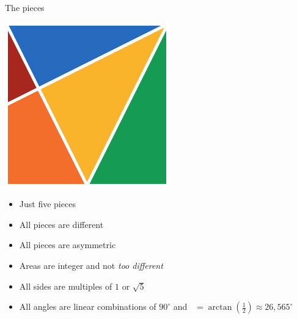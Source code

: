 \documentclass[14pt]{beamer}
\begin{document}

    \begin{frame}{The pieces}
        \begin{center}

            \begin{minipage}{17.5ex}\vspace{2ex}
                \includegraphics[height=17ex]{figures/figure001a.pdf}\\
            \end{minipage}\begin{minipage}{30ex}
                \footnotesize
                \begin{itemize}
                    \item Just five pieces
                    \item All pieces are different
                    \item All pieces are asymmetric
                    \item Areas are integer and not \emph{too different}
                    \item All sides are multiples of $1$ or $\sqrt{5}$
                    \item All angles are linear combinations of $90^\circ$ and \textalpha\ $= \arctan{\!\left(\tfrac{1}{2}\right)} \approx 26,565^\circ$
                \end{itemize}
            \end{minipage}

            \smallskip


\end{center}
\end{frame}
\end{document}
